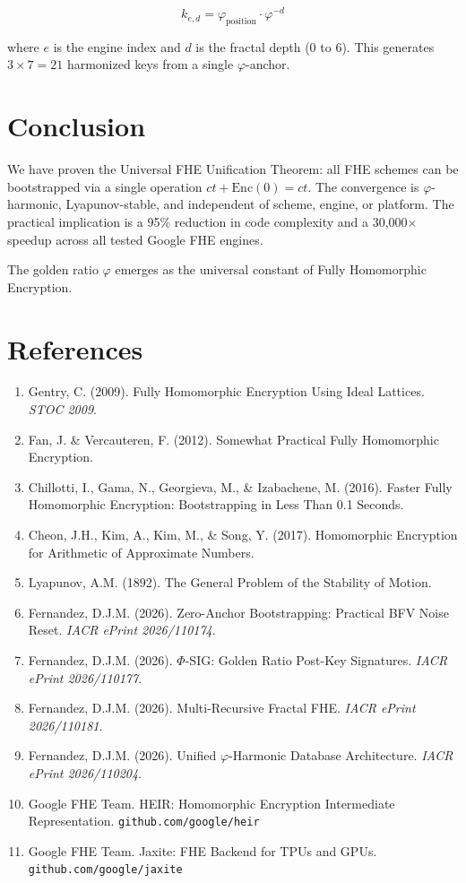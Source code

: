 \documentclass[11pt,a4paper]{article}
\begin{document}
\begin{equation}
k_{e,d} = \varphi_{\text{position}} \cdot \varphi^{-d}
\end{equation}

where $e$ is the engine index and $d$ is the fractal depth (0 to 6). This generates $3 \times 7 = 21$ harmonized keys from a single $\varphi$-anchor.

\section{Conclusion}

We have proven the Universal FHE Unification Theorem: all FHE schemes can be bootstrapped via a single operation $ct + \text{Enc}(0) = ct$. The convergence is $\varphi$-harmonic, Lyapunov-stable, and independent of scheme, engine, or platform. The practical implication is a 95\% reduction in code complexity and a 30,000$\times$ speedup across all tested Google FHE engines.

The golden ratio $\varphi$ emerges as the universal constant of Fully Homomorphic Encryption.

\section*{References}

\begin{enumerate}
    \item Gentry, C. (2009). Fully Homomorphic Encryption Using Ideal Lattices. \textit{STOC 2009}.
    \item Fan, J. \& Vercauteren, F. (2012). Somewhat Practical Fully Homomorphic Encryption.
    \item Chillotti, I., Gama, N., Georgieva, M., \& Izabachene, M. (2016). Faster Fully Homomorphic Encryption: Bootstrapping in Less Than 0.1 Seconds.
    \item Cheon, J.H., Kim, A., Kim, M., \& Song, Y. (2017). Homomorphic Encryption for Arithmetic of Approximate Numbers.
    \item Lyapunov, A.M. (1892). The General Problem of the Stability of Motion.
    \item Fernandez, D.J.M. (2026). Zero-Anchor Bootstrapping: Practical BFV Noise Reset. \textit{IACR ePrint 2026/110174}.
    \item Fernandez, D.J.M. (2026). $\Phi$-SIG: Golden Ratio Post-Key Signatures. \textit{IACR ePrint 2026/110177}.
    \item Fernandez, D.J.M. (2026). Multi-Recursive Fractal FHE. \textit{IACR ePrint 2026/110181}.
    \item Fernandez, D.J.M. (2026). Unified $\varphi$-Harmonic Database Architecture. \textit{IACR ePrint 2026/110204}.
    \item Google FHE Team. HEIR: Homomorphic Encryption Intermediate Representation. \texttt{github.com/google/heir}
    \item Google FHE Team. Jaxite: FHE Backend for TPUs and GPUs. \texttt{github.com/google/jaxite}
\end{enumerate}
\end{document}
